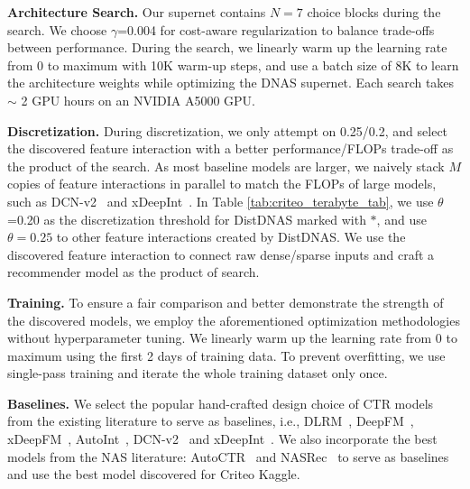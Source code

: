 \noindent \textbf{Architecture Search.}
Our supernet contains $N=7$ choice blocks during the search.
We choose $\gamma$=0.004 for cost-aware regularization to balance trade-offs between performance.
During the search, we linearly warm up the learning rate from 0 to maximum with 10K warm-up steps, and use a batch size of 8K to learn the architecture weights while optimizing the DNAS supernet.
Each search takes $\sim$ 2 GPU hours on an NVIDIA A5000 GPU.

\noindent \textbf{Discretization.}
During discretization, we only attempt on 0.25/0.2, and select the discovered feature interaction with a better performance/FLOPs trade-off as the product of the search. 
As most baseline models are larger, we naively stack $M$ copies of feature interactions in parallel to match the FLOPs of large models, such as DCN-v2~\cite{wang2021dcn} and xDeepInt~\cite{yan2023xdeepint}. In Table \ref{tab:criteo_terabyte_tab}, we use $\theta$=0.20 as the discretization threshold for DistDNAS marked with $*$, and use $\theta=0.25$ to other feature interactions created by DistDNAS. We use the discovered feature interaction to connect raw dense/sparse inputs and craft a recommender model as the product of search. 


\iffalse
\noindent  \textbf{Small-scale CTR tasks.} We use Criteo, Avazu, and KDD Cup 2012 as a set of small-scale CTR tasks.
We follow the data processing protocol in NASRec~\cite{zhang2022nasrec}. Specifically, we use a split of 80\% training data, 10\% validation data, and 10\% test data for each benchmark. We use Stratified K-fold to obtain the dataset splits, ensuring a balanced distribution of positive/negative labels. We use training and validation split to train the best discovered model, and report LogLoss/AUC on the test split.
\fi


\noindent  \textbf{Training.} To ensure a fair comparison and better demonstrate the strength of the discovered models, we employ the aforementioned optimization methodologies without hyperparameter tuning.
We linearly warm up the learning rate from 0 to maximum using the first 2 days of training data.
To prevent overfitting, we use single-pass training and iterate the whole training dataset only once.

\noindent \textbf{Baselines.} We select the popular hand-crafted design choice of CTR models from the existing literature to serve as baselines, i.e., DLRM~\cite{naumov2019deep}, DeepFM~\cite{guo2017deepfm}, xDeepFM~\cite{lian2018xdeepfm}, AutoInt~\cite{song2019autoint}, DCN-v2~\cite{wang2021dcn} and xDeepInt~\cite{yan2023xdeepint}. 
We also incorporate the best models from the NAS literature: AutoCTR~\cite{song2020towards} and NASRec~\cite{zhang2022nasrec} to serve as baselines and use the best model discovered for Criteo Kaggle.

